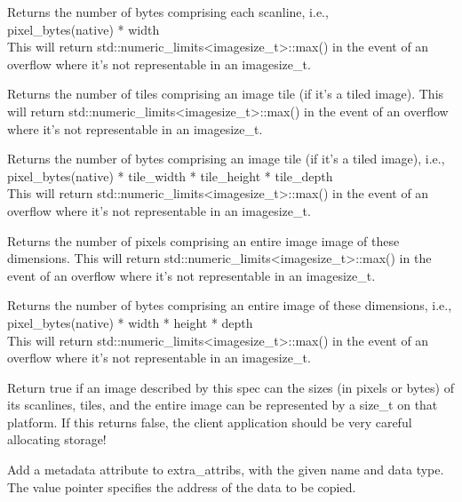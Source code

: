 Returns the number of bytes comprising each scanline,
i.e., \\ {\cf pixel_bytes(native) * width} \\
This will return {\cf std::numeric_limits<imagesize_t>::max()} in the event
of an overflow where it's not representable in an {\cf imagesize_t}.
\apiend

Returns the number of tiles comprising an image tile (if it's a tiled image).
This will return {\cf std::numeric_limits<imagesize_t>::max()} in the event
of an overflow where it's not representable in an {\cf imagesize_t}.
\apiend

Returns the number of bytes comprising an image tile (if it's a tiled
image), i.e., \\ {\cf pixel_bytes(native) * tile_width * tile_height * tile_depth } \\
This will return {\cf std::numeric_limits<imagesize_t>::max()} in the event
of an overflow where it's not representable in an {\cf imagesize_t}.
\apiend

Returns the number of pixels comprising an entire image image of these dimensions.
This will return {\cf std::numeric_limits<imagesize_t>::max()} in the event
of an overflow where it's not representable in an {\cf imagesize_t}.
\apiend

Returns the number of bytes comprising an entire image of these
dimensions, i.e., \\
{\cf pixel_bytes(native) * width * height * depth } \\
This will return {\cf std::numeric_limits<imagesize_t>::max()} in the event
of an overflow where it's not representable in an {\cf imagesize_t}.
\apiend

Return {\cf true} if an image described by this spec can the sizes
(in pixels or bytes) of its scanlines, tiles, and the entire image can
be represented by a {\cf size_t} on that platform.  If this returns
{\cf false}, the client application should be very careful allocating
storage!
\apiend


Add a metadata attribute to {\cf extra_attribs}, with the given name and
data type.  The {\cf value} pointer specifies
the address of the data to be copied.
\apiend

